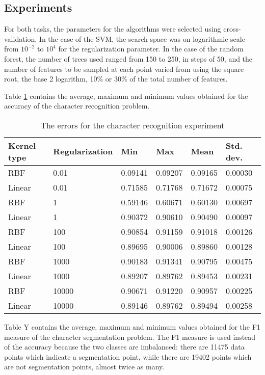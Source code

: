 \subsection{Experiments}

For both tasks, the parameters for the algorithms were selected using cross-validation. In the case of the SVM, the search space was on logarithmic scale from $10^{-2}$ to $10^4$ for the regularization parameter. In the case of the random forest, the number of trees used ranged from 150 to 250, in steps of 50, and the number of features to be sampled at each point varied from using the square root, the base 2 logarithm, 10\% or 30\% of the total number of features. 

Table \ref{table:recog_values} contains the average, maximum and minimum values obtained for the accuracy of the character recognition problem.

\begin{table}[h]
\caption{The errors for the character recognition experiment}
\label{table:recog_values}
\begin{tabular}{llllll}
\hline
Kernel type & Regularization & Min     & Max     & Mean    & Std. dev. \\ \hline
RBF & 0.01 & 0.09141 & 0.09207 & 0.09165 & 0.00030 \\ 
Linear & 0.01 & 0.71585 & 0.71768 & 0.71672 & 0.00075 \\ 
RBF & 1 & 0.59146 & 0.60671 & 0.60130 & 0.00697 \\ 
Linear & 1 & 0.90372 & 0.90610 & 0.90490 & 0.00097 \\ 
RBF & 100 & 0.90854 & 0.91159 & 0.91018 & 0.00126 \\ 
Linear & 100 & 0.89695 & 0.90006 & 0.89860 & 0.00128 \\ 
RBF & 1000 & 0.90183 & 0.91341 & 0.90795 & 0.00475 \\ 
Linear & 1000 & 0.89207 & 0.89762 & 0.89453 & 0.00231 \\ 
RBF & 10000 & 0.90671 & 0.91220 & 0.90957 & 0.00225 \\ 
Linear & 10000 & 0.89146 & 0.89762 & 0.89494 & 0.00258 \\ \hline
\end{tabular}
\end{table}

Table Y contains the average, maximum and minimum values obtained for the F1 measure of the character segmentation problem. The F1 measure is used instead of the accuracy because the two classes are imbalanced: there are 11475 data points which indicate a segmentation point, while there are 19402 points which are not segmentation points, almost twice as many. 

